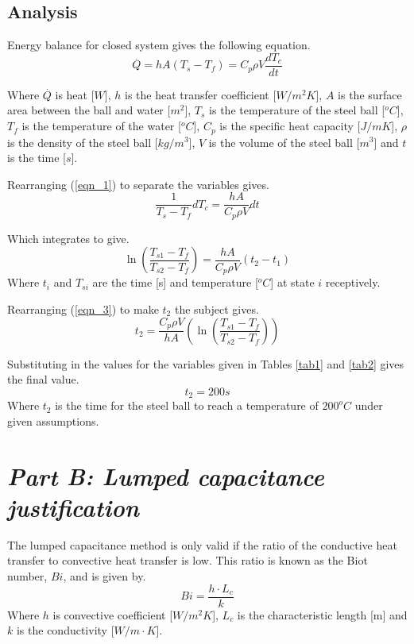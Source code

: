 \documentclass[11pt]{article}
\begin{document}
\subsection{Analysis}

Energy balance for closed system gives the following equation.
\begin{equation}\label{eqn_1}
	\stackrel{.}{Q} = hA(T_{s}-T_{f}) = C_{p}\rho V \frac{dT_{c}}{dt}
\end{equation}

Where $\stackrel{.}{Q}$ is heat [$W$], $h$ is the heat transfer coefficient [$W/m^{2}K$], $A$ is the surface area between the ball and water [$m^{2}$], $T_{s}$ is the temperature of the steel ball [$^{o}C$], $T_{f}$ is the temperature of the water [$^{o}C$], $C_{p}$ is the specific heat capacity [$J/mK$], $\rho$ is the density of the steel ball [$kg/m^{3}$], $V$ is the volume of the steel ball [$m^3$] and $t$ is the time [$s$].
\newline

Rearranging (\ref{eqn_1}) to separate the variables gives.
\begin{equation}\label{key}
	\frac{1}{T_{s}-T_{f}} dT_{c} = \frac{hA}{C_{p}\rho V}dt
\end{equation}

Which integrates to give.
\begin{equation}\label{eqn_3}
	\ln{(\frac{T_{s1}-T_{f}}{T_{s2}-T_{f}})} =  \frac{hA}{C_{p}\rho V}(t_{2}-t_{1})
\end{equation}
Where $t_{i}$ and $T_{si}$ are the time [s] and temperature [$^oC$] at state $i$ receptively.

Rearranging (\ref{eqn_3}) to make $t_{2}$ the subject gives.
\begin{equation}\label{key}
	t_{2} = \frac{C_{p}\rho V}{hA}(\ln{(\frac{T_{s1}-T_{f}}{T_{s2}-T_{f}})})
\end{equation}

Substituting in the values for the variables given in Tables \ref{tab1} and \ref{tab2} gives the final value.
\boldmath
\begin{equation}\label{t1}
	t_2 = 200 s
\end{equation}
\unboldmath
Where $t_2$ is the time for the steel ball to reach a temperature of $200^{o}C$ under given assumptions.

\section{\emph{Part B: Lumped capacitance justification}}
The lumped capacitance method is only valid if the ratio of the conductive heat transfer to convective heat transfer is low. This ratio is known as the Biot number, $Bi$, and is given by.
\begin{equation}\label{eqn_biot}
	Bi = \frac{h \cdot L_{c}}{k}
\end{equation}
Where $h$ is convective coefficient [$W/m^{2}K$], $L_{c}$ is the characteristic length [m] and $k$ is the conductivity [$W/m \cdot K$]. 
\end{document}
